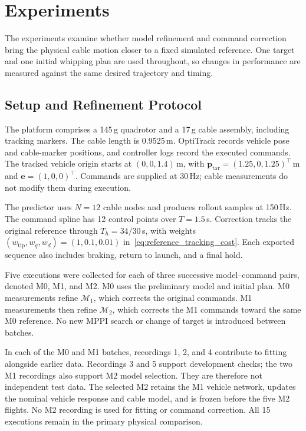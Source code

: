 \section{Experiments}
\label{sec:experiments}

The experiments examine whether model refinement and command
correction bring the physical cable motion closer to a fixed
simulated reference. One target and one initial whipping plan
are used throughout, so changes in performance are measured
against the same desired trajectory and timing.

\subsection{Setup and Refinement Protocol}
\label{subsec:experimental_setup}

The platform comprises a 145\,g quadrotor and a 17\,g cable
assembly, including tracking markers. The cable length is
0.9525\,m. OptiTrack records vehicle pose and cable-marker
positions, and controller logs record the executed commands.
The tracked vehicle origin starts at $(0,0,1.4)$\,m, with
$\mathbf p_{\mathrm{tar}}=(1.25,0,1.25)^\top$\,m and
$\mathbf e=(1,0,0)^\top$. Commands are supplied at 30\,Hz;
cable measurements do not modify them during execution.

The predictor uses $N=12$ cable nodes and produces rollout
samples at 150\,Hz. The command spline has 12 control points
over $T=1.5$\,s. Correction tracks the original reference through
$T_h=34/30$\,s, with weights
$(w_{\mathrm{tip}},w_q,w_d)=(1,0.1,0.01)$
in~\eqref{eq:reference_tracking_cost}. Each exported sequence
also includes braking, return to launch, and a final hold.

Five executions were collected for each of three successive
model--command pairs, denoted M0, M1, and M2. M0 uses the
preliminary model and initial plan. M0 measurements refine
$\mathcal M_1$, which corrects the original commands. M1
measurements then refine $\mathcal M_2$, which corrects the
M1 commands toward the same M0 reference. No new MPPI search
or change of target is introduced between batches.

In each of the M0 and M1 batches, recordings 1, 2, and 4
contribute to fitting alongside earlier data. Recordings 3
and 5 support development checks; the two M1 recordings also
support M2 model selection. They are therefore not independent
test data. The selected M2 retains the M1 vehicle network,
updates the nominal vehicle response and cable model, and
is frozen before the five M2 flights. No M2 recording is
used for fitting or command correction. All 15 executions
remain in the primary physical comparison.

